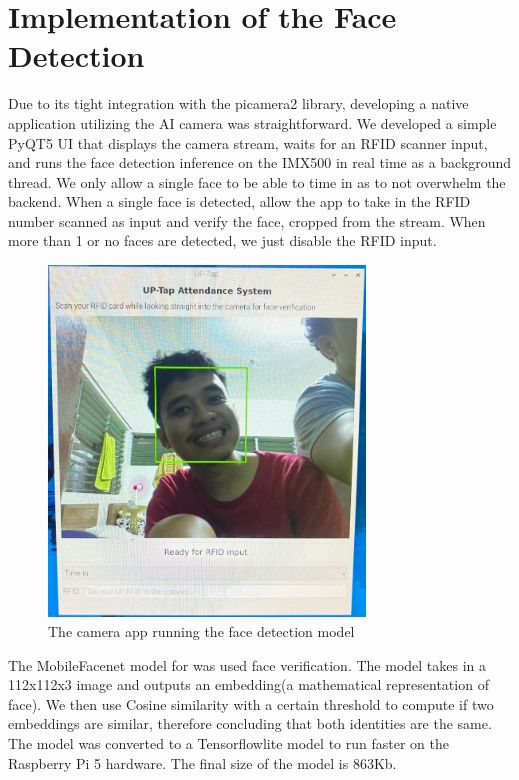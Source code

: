 \section{Implementation of the Face Detection}
Due to its tight integration with the picamera2 library, developing a native application utilizing the AI camera was straightforward. We developed a simple PyQT5 UI that displays the camera stream, waits for an RFID scanner input, and runs the face detection inference on the IMX500 in real time as a background thread. We only allow a single face to be able to time in as to not overwhelm the backend. When a single face is detected, allow the app to take in the RFID number scanned as input and verify the face, cropped from the stream. When more than 1 or no faces are detected, we just disable the RFID input.
\begin{figure}[h] %
	\centering
	\includegraphics[width=0.75\textwidth]{figures/chapter4/ai_cam_app.png} %
	\caption{The camera app running the face detection model}
	\label{fig:ai_cam_app}
\end{figure}

The MobileFacenet model for was used face verification. The model takes in a 112x112x3 image and outputs an embedding(a mathematical representation of face). We then use Cosine similarity with a certain threshold to compute if two embeddings are similar, therefore concluding that both identities are the same. The model was converted to a Tensorflowlite model to run faster on the Raspberry Pi 5 hardware. The final size of the model is 863Kb. 

